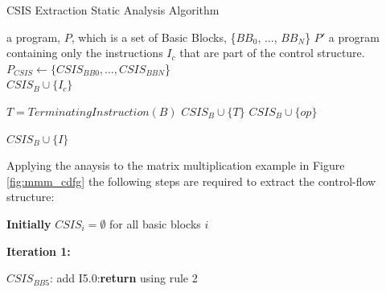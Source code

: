 \begin{algorithm}[t]
\caption{CSIS Extraction Static Analysis Algorithm
\label{alg:CSIS-extraction}}
    \begin{algorithmic}
        \INPUT a program, $P$, which is a set of Basic Blocks, \{$BB_0$, ..., $BB_N$\}
        \OUTPUT $P'$ a program containing only the instructions $I_c$ that are part of the control structure.
        \Statex
            \State $P_{CSIS} \gets \{CSIS_{BB0}, \dots,  CSIS_{BBN}$\}
                \\\hrulefill
                        \State $CSIS_B \cup \{I_{c}\}$
                    \EndFor
                \EndFor
                \\\hrulefill

                \State $T = TerminatingInstruction(B)$
                \State $CSIS_{B} \cup \{T\}$
                    \State $CSIS_{B} \cup \{op\}$
                \EndFor
                \\\hrulefill

                                \State $CSIS_{B} \cup \{I\}$
                            \EndIf
                        \EndFor
                    \EndFor
                \EndFor
            \EndFor
        \EndWhile
    \end{algorithmic}
\end{algorithm}

Applying the anaysis to the matrix multiplication example in Figure \ref{fig:mmm_cdfg} the
following steps are required to extract the control-flow structure:

\vspace{1mm}
\noindent
\textbf{Initially} $CSIS_{i} = \emptyset$ for all basic blocks $i$

\vspace{1pt}
\noindent
\hrulefill

\vspace{1mm}
\noindent
\textbf{Iteration 1:}

\vspace{-2pt}
\noindent
$CSIS_{BB5}$: add I5.0:\textbf{return} using rule 2 

